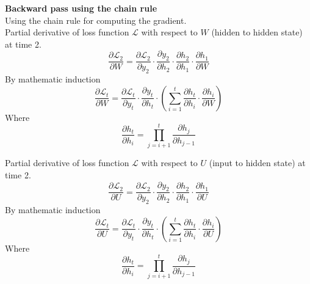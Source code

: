 \documentclass[12pt,a4paper]{article}
\begin{document}
\newline  %
\noindent \textbf{Backward pass using the chain rule}
\\[1ex]
Using the chain rule for computing the gradient.\\
Partial derivative of loss function $\mathcal{L}$ with respect to $W$ (hidden to hidden state) at time 2. 
\begin{equation}
    \dfrac{\partial\mathcal{L}_2}{\partial W} = \dfrac{\partial\mathcal{L}_2}{\partial y_2} \cdot \dfrac{\partial y_2}{\partial h_2} \cdot \dfrac{\partial h_2}{\partial h_1} \cdot \dfrac{\partial h_1}{\partial W}
\end{equation}
By mathematic induction 
\begin{equation}
    \dfrac{\partial\mathcal{L}_t}{\partial W} = \dfrac{\partial\mathcal{L}_t}{\partial y_t} \cdot \dfrac{\partial y_t}{\partial h_t} \cdot (\sum_{i=1}^{t} \dfrac{\partial h_t}{\partial h_i} \cdot \dfrac{\partial h_i}{\partial W})
\end{equation}
Where 
\begin{equation}
    \dfrac{\partial h_t}{\partial h_i} = \prod_{j=i+1}^{t} \dfrac{\partial h_j}{\partial h_{j-1}}
\end{equation}

Partial derivative of loss function $\mathcal{L}$ with respect to $U$ (input to hidden state) at time 2.\\
\begin{equation}
    \dfrac{\partial\mathcal{L}_2}{\partial U} = \dfrac{\partial\mathcal{L}_2}{\partial y_2} \cdot \dfrac{\partial y_2}{\partial h_2} \cdot \dfrac{\partial h_2}{\partial h_1} \cdot \dfrac{\partial h_1}{\partial U}
\end{equation}
By mathematic induction 
\begin{equation}
    \dfrac{\partial\mathcal{L}_t}{\partial U} = \dfrac{\partial\mathcal{L}_t}{\partial y_t} \cdot \dfrac{\partial y_t}{\partial h_t} \cdot (\sum_{i=1}^{t} \dfrac{\partial h_t}{\partial h_i} \cdot \dfrac{\partial h_i}{\partial U})
\end{equation}
Where 
\begin{equation}
    \dfrac{\partial h_t}{\partial h_i} = \prod_{j=i+1}^{t} \dfrac{\partial h_j}{\partial h_{j-1}}
\end{equation}
\end{document}
